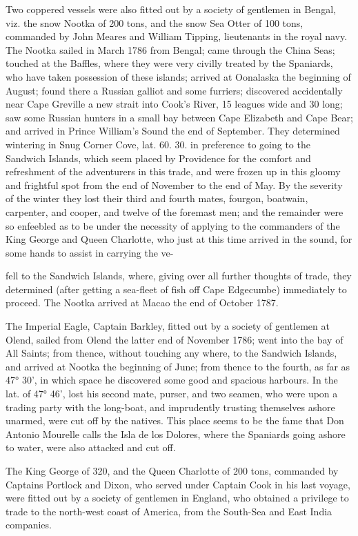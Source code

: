 \documentclass{article}
\begin{document}
Two coppered vessels were also fitted out by a society of gentlemen in Bengal, viz. the snow Nootka of 200 tons, and the snow Sea Otter of 100 tons, commanded by John Meares and William Tipping, lieutenants in the royal navy. The Nootka sailed in March 1786 from Bengal; came through the China Seas; touched at the Baffles, where they were very civilly treated by the Spaniards, who have taken possession of these islands; arrived at Oonalaska the beginning of August; found there a Russian galliot and some furriers; discovered accidentally near Cape Greville a new strait into Cook's River, 15 leagues wide and 30 long; saw some Russian hunters in a small bay between Cape Elizabeth and Cape Bear; and arrived in Prince William's Sound the end of September. They determined wintering in Snug Corner Cove, lat. 60. 30. in preference to going to the Sandwich Islands, which seem placed by Providence for the comfort and refreshment of the adventurers in this trade, and were frozen up in this gloomy and frightful spot from the end of November to the end of May. By the severity of the winter they lost their third and fourth mates, fourgon, boatwain, carpenter, and cooper, and twelve of the foremast men; and the remainder were so enfeebled as to be under the necessity of applying to the commanders of the King George and Queen Charlotte, who just at this time arrived in the sound, for some hands to assist in carrying the ve-

fell to the Sandwich Islands, where, giving over all further thoughts of trade, they determined (after getting a sea-fleet of fish off Cape Edgecumbe) immediately to proceed. The Nootka arrived at Macao the end of October 1787.

The Imperial Eagle, Captain Barkley, fitted out by a society of gentlemen at Olend, sailed from Olend the latter end of November 1786; went into the bay of All Saints; from thence, without touching any where, to the Sandwich Islands, and arrived at Nootka the beginning of June; from thence to the fourth, as far as 47° 30', in which space he discovered some good and spacious harbours. In the lat. of 47° 46', lost his second mate, purser, and two seamen, who were upon a trading party with the long-boat, and imprudently trusting themselves ashore unarmed, were cut off by the natives. This place seems to be the fame that Don Antonio Mourelle calls the Isla de los Dolores, where the Spaniards going ashore to water, were also attacked and cut off.

The King George of 320, and the Queen Charlotte of 200 tons, commanded by Captains Portlock and Dixon, who served under Captain Cook in his last voyage, were fitted out by a society of gentlemen in England, who obtained a privilege to trade to the north-west coast of America, from the South-Sea and East India companies.
\end{document}
